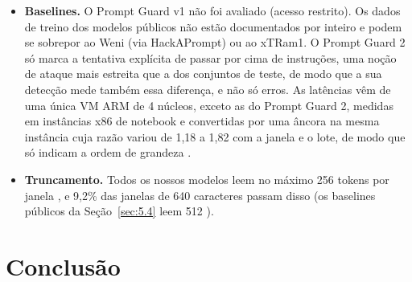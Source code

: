 \documentclass[11pt]{article}
\begin{document}
\begin{itemize}
.
\item \textbf{Baselines.} O Prompt Guard v1 não foi avaliado (acesso restrito). Os dados de treino dos modelos públicos não estão documentados por inteiro e podem se sobrepor ao Weni (via HackAPrompt) ou ao xTRam1. O Prompt Guard 2 só marca a tentativa explícita de passar por cima de instruções, uma noção de ataque mais estreita que a dos conjuntos de teste, de modo que a sua detecção mede também essa diferença, e não só erros. As latências vêm de uma única VM ARM de 4 núcleos, exceto as do Prompt Guard 2, medidas em instâncias x86 de notebook e convertidas por uma âncora na mesma instância cuja razão variou de 1,18 a 1,82 com a janela e o lote, de modo que só indicam a ordem de grandeza%
.
\item \textbf{Truncamento.} Todos os nossos modelos leem no máximo 256 tokens por janela%
, e 9,2\% das janelas de 640 caracteres passam disso %
(os baselines públicos da Seção~\ref{sec:5.4} leem 512%
).
\end{itemize}

\section{Conclusão}\label{sec:11}
\end{document}
